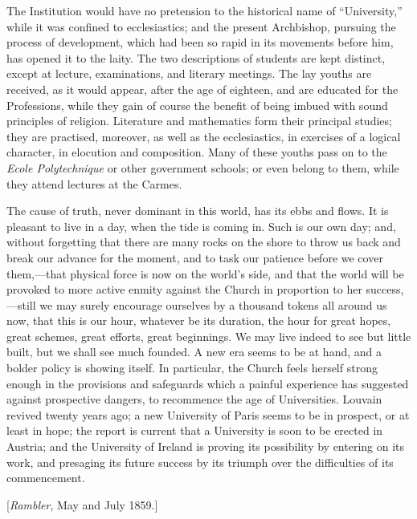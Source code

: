 The Institution would have no
pretension to the historical name of ``University,'' while it was
confined to ecclesiastics; and the present Archbishop, pursuing the
process of development, which had been so rapid in its movements
before him, has opened it to the laity. The two descriptions of
students are kept distinct, except at lecture, examinations, and
literary meetings. The lay youths are received, as it would appear,
after the age of eighteen, and are educated for the Professions, while
they gain of course the benefit of being imbued with sound principles
of religion. Literature and mathematics form their principal studies;
they are practised, moreover, as well as the ecclesiastics, in
exercises of a logical character, in elocution and composition. Many
of these youths pass on to the \emph{Ecole Polytechnique} or other
government schools; or even belong to them, while they attend
lectures at the Carmes.

The cause of truth, never
dominant in this world, has its ebbs and flows. It is pleasant to live
in a day, when the tide is coming in. Such is our own day; and,
without forgetting that there are many rocks on the shore to throw us
back and break our advance for the moment, and to task our patience
before we cover them,—that physical force is now on the world's
side, and that the world will be provoked to more active enmity
against the Church in proportion to her success,—still we may surely
encourage ourselves by a thousand tokens all around us now, that this
is our hour, whatever be its duration, the hour for great hopes, great
schemes, great efforts, great beginnings. We may live indeed to see
but little built, but we shall see much founded. A new era seems to be
at hand, and a bolder policy is showing itself. In particular, the
Church feels herself strong enough in the provisions and safeguards
which a painful experience has suggested against prospective dangers,
to recommence the age of Universities. Louvain revived twenty years
ago; a new University of Paris seems to be in prospect, or at least in
hope; the report is current that a University is soon to be erected in
Austria; and the University of Ireland is proving its possibility by
entering on its work, and presaging its future success by its triumph
over the difficulties of its commencement.


[\emph{Rambler}, May and July
1859.]


